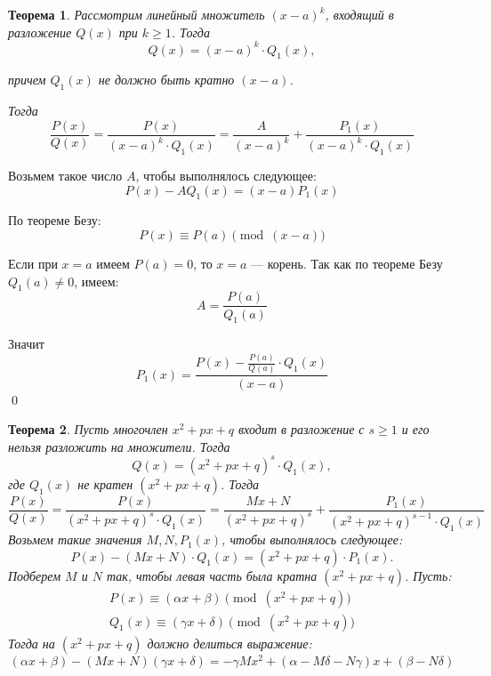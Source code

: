 \documentclass[a4paper,12pt,oneside]{extbook}
\theoremstyle{numbered}
\theoremstyle{unnumbered}
\theoremstyle{named}
\newtheorem{theorem}{Теорема}[section]
\theoremstyle{unnumbered}
\theoremstyle{named}
\theoremstyle{named}
\theoremstyle{named}
\renewenvironment{proof}{{\noindent\textbf{Доказательство.}}}{\qed}
\begin{document}
\begin{theorem}
    Рассмотрим линейный множитель \((x - a)^k\), входящий в разложение \(Q(x)\) при \(k \geq 1\). Тогда
    \[
        Q(x) = (x - a)^k \cdot Q_1(x),
    \]

    причем \(Q_1(x)\) не должно быть кратно \((x - a)\).

    Тогда
    \[
        \frac{P(x)}{Q(x)} = \frac{P(x)}{(x - a)^k \cdot Q_1(x)} = \frac{A}{(x - a)^k} + \frac{P_1(x)}{(x - a)^k \cdot Q_1(x)}
    \]
\end{theorem}

\begin{proof}
    Возьмем такое число \(A\), чтобы выполнялось следующее:
    \[
        P(x) - A Q_1(x) = (x - a) P_1(x)
    \]

    По теореме Безу:
    \begin{equation}
        P(x) \equiv P(a) \pmod{(x - a)}
    \end{equation}

    Если при \(x = a\) имеем \(P(a) = 0\), то \(x = a\) — корень. Так как по теореме Безу \(Q_1(a) \neq 0\), имеем:
    \begin{equation}
        A = \frac{P(a)}{Q_1(a)}
    \end{equation}

    Значит
    \[
        P_1(x) = \frac{P(x) - \frac{P(a)}{Q(a)} \cdot Q_1(x)}{(x - a)}
    \]
\end{proof}

\begin{theorem}
    Пусть многочлен \(x^2 + px + q\) входит в разложение с \(s \geq 1\) и его нельзя разложить на множители. Тогда
    \begin{equation}
        Q(x) = (x^2 + px + q)^s \cdot Q_1(x),
    \end{equation}
    где \(Q_1(x)\) не кратен \((x^2 + px + q)\). Тогда
    \begin{equation}
        \frac{P(x)}{Q(x)} = \frac{P(x)}{(x^2 + px + q)^s \cdot Q_1(x)} = \frac{Mx + N}{(x^2 + px + q)^s} + \frac{P_1(x)}{(x^2 + px + q)^{s - 1} \cdot Q_1(x)}
    \end{equation}
    Возьмем такие значения \(M, N, P_1(x)\), чтобы выполнялось следующее:
    \begin{equation}
        P(x) - (Mx + N) \cdot Q_1(x) = (x^2 + px + q) \cdot P_1(x).
    \end{equation}
    Подберем \(M\) и \(N\) так, чтобы левая часть была кратна \((x^2 + px + q)\). Пусть:
    \begin{equation}
        \begin{gathered}
            P(x) \equiv (\alpha x + \beta) \pmod{(x^2 + px + q)} \\
            Q_1(x) \equiv (\gamma x + \delta) \pmod{(x^2 + px + q)}
        \end{gathered}
    \end{equation}
    Тогда на \((x^2 + px + q)\) должно делиться выражение:
    \begin{equation}
        (\alpha x + \beta) - (Mx + N)(\gamma x + \delta) = - \gamma Mx^2 + (\alpha - M\delta - N\gamma)x + (\beta - N\delta)
    \end{equation}
\end{theorem}
\end{document}

